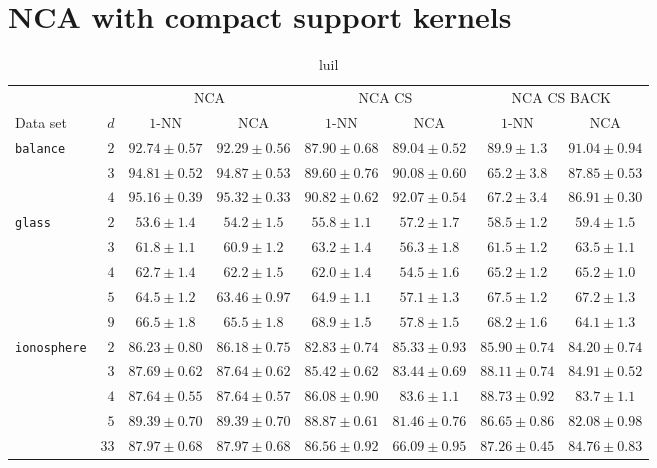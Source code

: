 \section{NCA with compact support kernels}
\label{app:sec:nca-cs}

\begin{landscape}
  \begin{table}
    \centering\begin{tabular}{lrcccccc}
      \toprule
      &     & \multicolumn{2}{c}{NCA}  & \multicolumn{2}{c}{NCA CS} & \multicolumn{2}{c}{NCA CS BACK}\\
      \cmidrule(r){3-4} \cmidrule(r){5-6} \cmidrule(r){7-8}
      Data set & $d$ & $1$-NN & NCA & $1$-NN & NCA & $1$-NN & NCA \\
      \midrule
      \texttt{balance}&$2$&$92.74 \pm 0.57$&$92.29 \pm 0.56$&$87.90 \pm 0.68$&$89.04 \pm 0.52$&$89.9 \pm 1.3$&$91.04 \pm 0.94$\\ 
      &$3$&$94.81 \pm 0.52$&$94.87 \pm 0.53$&$89.60 \pm 0.76$&$90.08 \pm 0.60$&$65.2 \pm 3.8$&$87.85 \pm 0.53$\\ 
      &$4$&$95.16 \pm 0.39$&$95.32 \pm 0.33$&$90.82 \pm 0.62$&$92.07 \pm 0.54$&$67.2 \pm 3.4$&$86.91 \pm 0.30$\\ 
      \midrule
      \texttt{glass}&$2$&$53.6 \pm 1.4$&$54.2 \pm 1.5$&$55.8 \pm 1.1$&$57.2 \pm 1.7$&$58.5 \pm 1.2$&$59.4 \pm 1.5$\\ 
      &$3$&$61.8 \pm 1.1$&$60.9 \pm 1.2$&$63.2 \pm 1.4$&$56.3 \pm 1.8$&$61.5 \pm 1.2$&$63.5 \pm 1.1$\\ 
      &$4$&$62.7 \pm 1.4$&$62.2 \pm 1.5$&$62.0 \pm 1.4$&$54.5 \pm 1.6$&$65.2 \pm 1.2$&$65.2 \pm 1.0$\\ 
      &$5$&$64.5 \pm 1.2$&$63.46 \pm 0.97$&$64.9 \pm 1.1$&$57.1 \pm 1.3$&$67.5 \pm 1.2$&$67.2 \pm 1.3$\\ 
      &$9$&$66.5 \pm 1.8$&$65.5 \pm 1.8$&$68.9 \pm 1.5$&$57.8 \pm 1.5$&$68.2 \pm 1.6$&$64.1 \pm 1.3$\\ 
      \midrule
      \texttt{ionosphere}&$2$&$86.23 \pm 0.80$&$86.18 \pm 0.75$&$82.83 \pm 0.74$&$85.33 \pm 0.93$&$85.90 \pm 0.74$&$84.20 \pm 0.74$\\ 
      &$3$&$87.69 \pm 0.62$&$87.64 \pm 0.62$&$85.42 \pm 0.62$&$83.44 \pm 0.69$&$88.11 \pm 0.74$&$84.91 \pm 0.52$\\ 
      &$4$&$87.64 \pm 0.55$&$87.64 \pm 0.57$&$86.08 \pm 0.90$&$83.6 \pm 1.1$&$88.73 \pm 0.92$&$83.7 \pm 1.1$\\ 
      &$5$&$89.39 \pm 0.70$&$89.39 \pm 0.70$&$88.87 \pm 0.61$&$81.46 \pm 0.76$&$86.65 \pm 0.86$&$82.08 \pm 0.98$\\ 
      &$33$&$87.97 \pm 0.68$&$87.97 \pm 0.68$&$86.56 \pm 0.92$&$66.09 \pm 0.95$&$87.26 \pm 0.45$&$84.76 \pm 0.83$\\ 
      \bottomrule
    \end{tabular}
  \caption{luil}
  \end{table}


\end{landscape}
